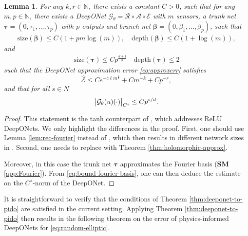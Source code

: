 \documentclass{article}
\numberwithin{equation}{section}
\newcommand{\size}{\mathrm{size}}
\newcommand{\depth}{\mathrm{depth}}
\newcommand{\Err}{\widehat{\mathscr{E}}}
\newcommand{\N}{\mathbb{N}}
\newcommand{\cA}{\mathcal{A}}
\newcommand{\cE}{\mathcal{E}}
\newcommand{\cG}{\mathcal{G}}
\newcommand{\cR}{\mathcal{R}}
\renewcommand{\tr}{{{\tau}}}
\newcommand{\trunk}{{\bm{\tau}}}
\newcommand{\branch}{{\bm{\beta}}}
\newcommand{\1}{\mathbbm{1}}
\newtheorem{lemma}[theorem]{Lemma}
\begin{document}
\begin{lemma}\label{lem:elliptic}
For any $k,r \in \N$, there exists a constant $C>0$, such that for any $m,p\in \N$, there exists a DeepONet $\cG_\theta = \cR \circ \cA \circ \cE$ with $m$ sensors, a trunk net $\trunk = (0,\tr_1, \dots, \tr_p)$ with $p$ outputs and branch net $\branch = (0,\beta_1,\dots, \beta_p)$, such that 
\begin{gather}
\size(\branch) \le C(1+pm \log(m)), \quad
\depth(\branch) \le C(1+ \log(m)),
\end{gather}
and
\begin{gather}
\size(\trunk) \le Cp^{\frac{d+1}{d}} \quad
\depth(\trunk) \le 2
\end{gather}
such that the DeepONet approximation error \eqref{eq:approxerr} satisfies
\begin{equation}
\label{eq:elliptic-err}
\Err
\le
C e^{-c\ell m^{\frac{1}{d}}}
+
C m^{-k}
+
C p^{-r},
\end{equation}
and that for all $s\in N$
\begin{equation}
     \abs{\cG_\theta(u)(\cdot)}_{C^s} \leq C p^{s/d}. 
\end{equation}
\end{lemma}

\begin{proof}
This statement is the tanh counterpart of \cite[Theorem 4.19]{LMK1}, which addresses ReLU DeepONets. We only highlight the differences in the proof. First, one should use Lemma \ref{lem:rec-fourier} instead of \cite[Lemma 3.13]{LMK1}, which then results in different network sizes in \cite[Lemma 3.14, Proposition 3.17, Corollary 3.18, Proposition 4.17]{LMK1}. Second, one needs to replace \cite[Proposition 4.18]{LMK1} with Theorem \ref{thm:holomorphic-approx}.

Moreover, in this case the trunk net $\trunk$ approximates the Fourier basis (\textbf{SM} \ref{app:Fourier}). From \eqref{eq:bound-fourier-basis}, one can then deduce the estimate on the $C^s$-norm of the DeepONet. 
\end{proof}

It is straightforward to verify that the conditions of Theorem \ref{thm:deeponet-to-pido} are satisfied in the current setting. Applying Theorem \ref{thm:deeponet-to-pido} then results in the following theorem on the error of physics-informed DeepONets for \eqref{eq:random-elliptic}.
\end{document}
